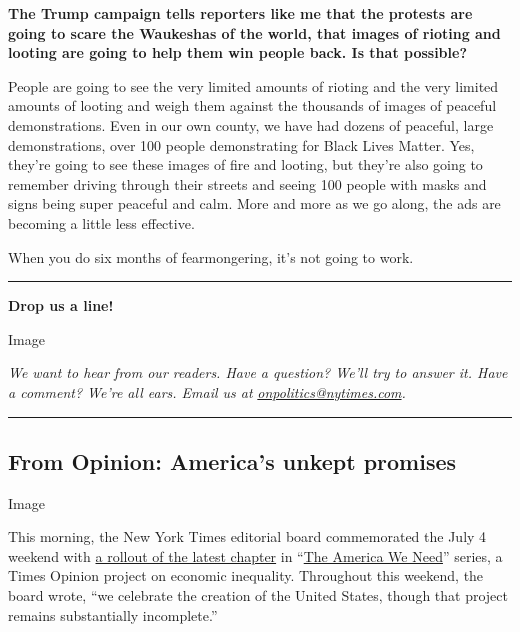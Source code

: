 \textbf{The Trump campaign tells reporters like me that the protests are
going to scare the Waukeshas of the world, that images of rioting and
looting are going to help them win people back. Is that possible?}

People are going to see the very limited amounts of rioting and the very
limited amounts of looting and weigh them against the thousands of
images of peaceful demonstrations. Even in our own county, we have had
dozens of peaceful, large demonstrations, over 100 people demonstrating
for Black Lives Matter. Yes, they're going to see these images of fire
and looting, but they're also going to remember driving through their
streets and seeing 100 people with masks and signs being super peaceful
and calm. More and more as we go along, the ads are becoming a little
less effective.

When you do six months of fearmongering, it's not going to work.

\begin{center}\rule{0.5\linewidth}{\linethickness}\end{center}

\textbf{Drop us a line!}

Image

\emph{We want to hear from our readers. Have a question? We'll try to
answer it. Have a comment? We're all ears. Email us at}
\href{mailto:onpolitics@nytimes.com}{\emph{onpolitics@nytimes.com}}\emph{.}

\begin{center}\rule{0.5\linewidth}{\linethickness}\end{center}

\hypertarget{from-opinion-americas-unkept-promises}{%
\subsection{From Opinion: America's unkept
promises}\label{from-opinion-americas-unkept-promises}}

Image

This morning, the New York Times editorial board commemorated the July 4
weekend with
\href{https://www.nytimes.com/2020/07/02/opinion/income-inequality-solutions.html}{a
rollout of the latest chapter} in
``\href{https://www.nytimes.com/2020/04/09/opinion/sunday/coronavirus-inequality-america.html}{The
America We Need}'' series, a Times Opinion project on economic
inequality. Throughout this weekend, the board wrote, ``we celebrate the
creation of the United States, though that project remains substantially
incomplete.''

